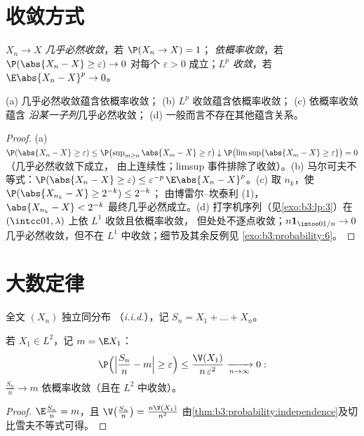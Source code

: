 \section{收敛方式}

\begin{definition}\label{def:b3:probability:modes}
$X_n \to X$ \emph{几乎必然收敛}，若 $\P(X_n \to X) = 1$；
\emph{依概率收敛}，若 $\P(\abs{X_n - X} \geq \varepsilon)
\to 0$ 对每个 $\varepsilon > 0$ 成立；\emph{$L^p$ 收敛}，若
$\E\abs{X_n - X}^p \to 0$。
\end{definition}

\begin{proposition}\label{prop:b3:probability:modes}
(a) 几乎必然收敛蕴含依概率收敛；
(b) $L^p$ 收敛蕴含依概率收敛；
(c) 依概率收敛蕴含
\emph{沿某一子列}几乎必然收敛；
(d) 一般而言不存在其他蕴含关系。
\end{proposition}

\begin{proof}
(a) $\P(\abs{X_n - X} \geq \varepsilon) \leq
\P\bigl(\sup_{m\geq n}\abs{X_m - X} \geq \varepsilon\bigr)
\downarrow \P\bigl(\limsup\{\abs{X_m - X} \geq
\varepsilon\}\bigr) = 0$（几乎必然收敛下成立，
由上连续性；limsup 事件排除了收敛）。(b)
马尔可夫不等式：$\P(\abs{X_n - X} \geq \varepsilon) \leq
\varepsilon^{-p}\,\E\abs{X_n - X}^p$。(c) 取 $n_k$，使
$\P(\abs{X_{n_k} - X} \geq 2^{-k}) \leq 2^{-k}$；
由博雷尔–坎泰利 (1)，$\abs{X_{n_k} - X} < 2^{-k}$
最终几乎必然成立。(d) 打字机序列（见\cref{exo:b3:lp:3}）在
$(\intcc01, \lambda)$ 上依 $L^1$ 收敛且依概率收敛，
但处处不逐点收敛；$n\mathbf 1_{\intoo0{1/n}} \to 0$
几乎必然收敛，但不在 $L^1$ 中收敛；细节及其余反例见
\cref{exo:b3:probability:6}。
\end{proof}

\section{大数定律}

全文 $(X_n)$ 独立同分布
（\emph{i.i.d.}），记 $S_n = X_1 + \dots + X_n$。

\begin{theorem}[弱大数定律]
\label{thm:b3:probability:wlln}
若 $X_1 \in L^2$，记 $m = \E X_1$：
\[
\P\Bigl(\Bigl|\frac{S_n}{n} - m\Bigr| \geq
\varepsilon\Bigr) \leq
\frac{\V(X_1)}{n\,\varepsilon^2}
\xrightarrow[n\to\infty]{} 0 :
\]
$\frac{S_n}n \to m$ 依概率收敛（且在 $L^2$ 中收敛）。
\end{theorem}

\begin{proof}
$\E\frac{S_n}n = m$，且 $\V\bigl(\frac{S_n}n\bigr) =
\frac{n\V(X_1)}{n^2}$
由\cref{thm:b3:probability:independence}及切比雪夫不等式可得。
\end{proof}


